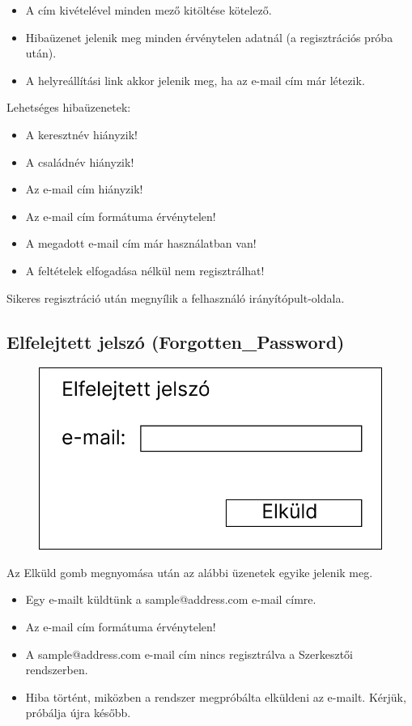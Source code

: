 \documentclass[a4paper,12pt]{article}
\begin{document}
\begin{itemize}
	\item A cím kivételével minden mező kitöltése kötelező.
	\item Hibaüzenet jelenik meg minden érvénytelen adatnál (a regisztrációs próba után).
	\item A helyreállítási link akkor jelenik meg, ha az e-mail cím már létezik.
\end{itemize}

Lehetséges hibaüzenetek:
\begin{itemize}
	\item A keresztnév hiányzik!
	\item A családnév hiányzik!
	\item Az e-mail cím hiányzik!
	\item Az e-mail cím formátuma érvénytelen!
	\item A megadott e-mail cím már használatban van!
	\item A feltételek elfogadása nélkül nem regisztrálhat!
\end{itemize}

Sikeres regisztráció után megnyílik a felhasználó irányítópult-oldala.

\subsection{Elfelejtett jelszó (Forgotten\_Password)}

\begin{figure}
	\centering
	\includegraphics[width=\textwidth]{images/Web_pages/Forgotten_Password.jpg}
	\caption{}
	\label{fig:Forgotten_Password}
\end{figure}

Az Elküld gomb megnyomása után az alábbi üzenetek egyike jelenik meg.

\begin{itemize}
	\item Egy e-mailt küldtünk a sample@address.com e-mail címre.
	\item Az e-mail cím formátuma érvénytelen!
	\item A sample@address.com e-mail cím nincs regisztrálva a Szerkesztői rendszerben.
	\item Hiba történt, miközben a rendszer megpróbálta elküldeni az e-mailt. Kérjük, próbálja újra később.
\end{itemize}
\end{document}
